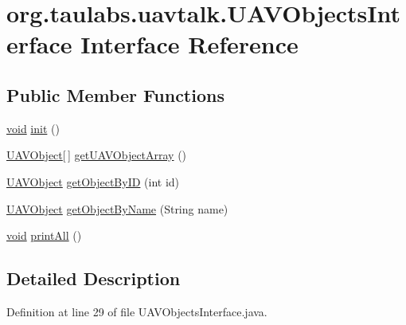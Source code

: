 \hypertarget{interfaceorg_1_1taulabs_1_1uavtalk_1_1_u_a_v_objects_interface}{\section{org.\-taulabs.\-uavtalk.\-U\-A\-V\-Objects\-Interface \-Interface \-Reference}
\label{interfaceorg_1_1taulabs_1_1uavtalk_1_1_u_a_v_objects_interface}
}
\subsection*{\-Public \-Member \-Functions}
\begin{DoxyCompactItemize}
\item 
\hyperlink{group___u_a_v_objects_plugin_ga444cf2ff3f0ecbe028adce838d373f5c}{void} \hyperlink{interfaceorg_1_1taulabs_1_1uavtalk_1_1_u_a_v_objects_interface_ace7abcc9e1c30961f93208d326cd34d1}{init} ()
\item 
\hyperlink{classorg_1_1taulabs_1_1uavtalk_1_1_u_a_v_object}{\-U\-A\-V\-Object}\mbox{[}$\,$\mbox{]} \hyperlink{interfaceorg_1_1taulabs_1_1uavtalk_1_1_u_a_v_objects_interface_a9eae9614a5916c6123a8429e33d891dd}{get\-U\-A\-V\-Object\-Array} ()
\item 
\hyperlink{classorg_1_1taulabs_1_1uavtalk_1_1_u_a_v_object}{\-U\-A\-V\-Object} \hyperlink{interfaceorg_1_1taulabs_1_1uavtalk_1_1_u_a_v_objects_interface_a7be79110e6ad70ae659a2efa96316836}{get\-Object\-By\-I\-D} (int id)
\item 
\hyperlink{classorg_1_1taulabs_1_1uavtalk_1_1_u_a_v_object}{\-U\-A\-V\-Object} \hyperlink{interfaceorg_1_1taulabs_1_1uavtalk_1_1_u_a_v_objects_interface_a98c4aea734aab8a13536083f6a7057dd}{get\-Object\-By\-Name} (\-String name)
\item 
\hyperlink{group___u_a_v_objects_plugin_ga444cf2ff3f0ecbe028adce838d373f5c}{void} \hyperlink{interfaceorg_1_1taulabs_1_1uavtalk_1_1_u_a_v_objects_interface_a887c4e03836e580835619b29ec1154d2}{print\-All} ()
\end{DoxyCompactItemize}


\subsection{\-Detailed \-Description}


\-Definition at line 29 of file \-U\-A\-V\-Objects\-Interface.\-java.



